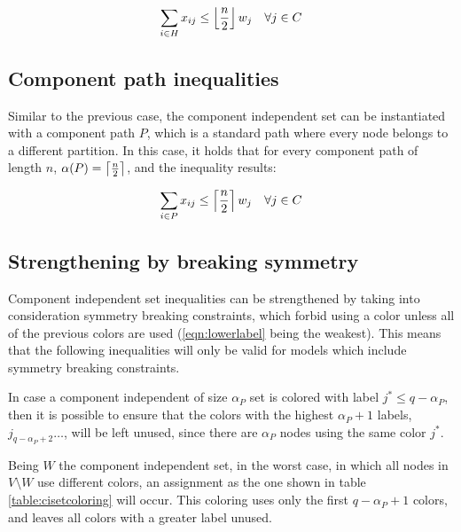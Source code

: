 \begin{equation}
\label{ineq:chole}
\sum _{i \in H} x_{ij} \leq \left\lfloor \frac{n}{2} \right\rfloor w_{j} \quad \forall j \in C
\end{equation}

\subsection{Component path inequalities}

Similar to the previous case, the component independent set can be instantiated with a component path $P$, which is a standard path where every node belongs to a different partition. In this case, it holds that for every component path of length $n$, $\alpha(P) = \left\lceil \frac{n}{2} \right\rceil$, and the inequality results:

\begin{equation}
\label{ineq:cpath}
\sum _{i \in P} x_{ij} \leq \left\lceil \frac{n}{2} \right\rceil w_{j} \quad \forall j \in C
\end{equation}

\subsection{Strengthening by breaking symmetry}

Component independent set inequalities can be strengthened by taking into consideration symmetry breaking constraints, which forbid using a color unless all of the previous colors are used (\ref{eqn:lowerlabel} being the weakest). This means that the following inequalities will only be valid for models which include symmetry breaking constraints.

In case a component independent of size $\alpha_P$ set is colored with label $j^* \leq q - \alpha_P$, then it is possible to ensure that the colors with the highest $\alpha_P +1$ labels, $j_{q-\alpha_P+2} \ldots$, will be left unused, since there are $\alpha_P$ nodes using the same color $j^*$.

Being $W$ the component independent set, in the worst case, in which all nodes in $V \setminus W$ use different colors, an assignment as the one shown in table \ref{table:cisetcoloring} will occur. This coloring uses only the first $q - \alpha_P + 1$ colors, and leaves all colors with a greater label unused. 

